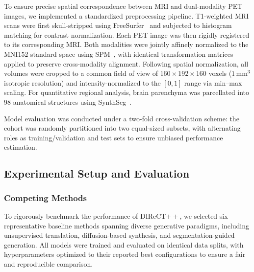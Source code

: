 \documentclass[a4paper]{cas-sc}
\begin{document}
To ensure precise spatial correspondence between MRI and dual-modality PET images, we implemented a standardized preprocessing pipeline. T1-weighted MRI scans were first skull-stripped using FreeSurfer~\citep{Freesurfer} and subjected to histogram matching for contrast normalization. Each PET image was then rigidly registered to its corresponding MRI. Both modalities were jointly affinely normalized to the MNI152 standard space using SPM~\citep{spm}, with identical transformation matrices applied to preserve cross-modality alignment. Following spatial normalization, all volumes were cropped to a common field of view of $160 \times 192 \times 160$ voxels ($1\,\text{mm}^3$ isotropic resolution) and intensity-normalized to the $[0, 1]$ range via min–max scaling. For quantitative regional analysis, brain parenchyma was parcellated into 98 anatomical structures using SynthSeg~\citep{synthseg}.

Model evaluation was conducted under a two-fold cross-validation scheme: the cohort was randomly partitioned into two equal-sized subsets, with alternating roles as training/validation and test sets to ensure unbiased performance estimation.
\subsection{Experimental Setup and Evaluation}
\subsubsection{Competing Methods}
To rigorously benchmark the performance of DIReCT$++$, we selected six representative baseline methods spanning diverse generative paradigms, including unsupervised translation, diffusion-based synthesis, and segmentation-guided generation. All models were trained and evaluated on identical data splits, with hyperparameters optimized to their reported best configurations to ensure a fair and reproducible comparison.
\end{document}
